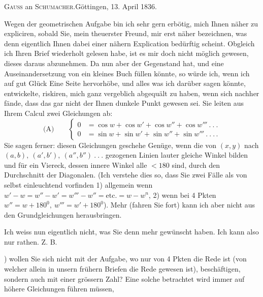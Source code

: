 \begin{center}\textsc{Gauss} an \textsc{Schumacher}.\quad Göttingen, 13. April 1836.\end{center}
\indent Wegen der geometrischen Aufgabe bin ich sehr gern erbötig, mich Ihnen näher zu expliciren, sobald Sie, mein theuerster Freund, mir erst näher bezeichnen, was denn eigentlich Ihnen dabei einer nähern Explication bedürftig scheint. Obgleich ich Ihren Brief wiederholt gelesen habe, ist es mir doch nicht möglich gewesen, dieses daraus abzunehmen. Da nun aber der Gegenstand  hat, und eine  Auseinandersetzung von  ein kleines Buch füllen könnte, so würde ich, wenn ich auf gut Glück Eine Seite hervorhöbe, und alles was ich darüber sagen könnte, entwickelte, riskiren, mich ganz vergeblich abgequält zu haben, wenn sich nachher fände, dass das gar nicht der Ihnen dunkele Punkt gewesen sei. Sie leiten aus Ihrem
\clearpage{}
\noindent Calcul zwei Gleichungen ab:
\[
\text{(A)}\qquad\left\{\begin{aligned}
0&=\cos w+\cos w'+\cos w''+\cos w'''\ .\ .\ .\\
0&=\sin w+\sin w'+\sin w''+\sin w'''\ .\ .\ .\,.
\end{aligned}\right.
\]
\noindent Sie sagen ferner: diesen Gleichungen geschehe Genüge, wenn die von \((x,y)\) nach \((a,b),\ (a',b'),\ (a'',b'')\ .\ .\ .\) gezogenen Linien lauter gleiche Winkel bilden und für ein Viereck, dessen innere Winkel alle \(<180\) sind, durch den Durchschnitt der Diagonalen. (Ich verstehe dies so, dass Sie zwei Fälle als von selbst einleuchtend vorfinden 1) allgemein wenn \(w'-w=w''-w'=w'''-w''=\text{etc.}=w-w^n\), 2) wenn bei 4 Pkten \(w''=w+180^{0},\ w'''=w'+180^{0}\)). Mehr (fahren Sie fort) kann ich aber nicht aus den Grundgleichungen herausbringen.

\indent Ich weiss nun eigentlich nicht, was Sie denn mehr gewünscht haben. Ich kann also nur rathen. Z. B.

) wollen Sie sich nicht mit der Aufgabe, wo nur von 4 Pkten die Rede ist (von welcher allein in unsern frühern Briefen die Rede gewesen ist), beschäftigen, sondern auch mit einer grössern Zahl? Eine solche  betrachtet wird immer auf höhere Gleichungen führen müssen,

